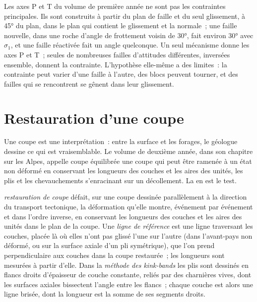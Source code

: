 Les axes P et T du volume de première année ne sont pas les contraintes principales. Ils
sont construits à partir du plan de faille et du seul glissement, à \ang{45} du plan, dans
le plan qui contient le glissement et la normale~; une faille nouvelle, dans une roche d'angle
de frottement voisin de \ang{30}, fait environ \ang{30} avec $\sigma_1$, et une faille réactivée
fait un angle quelconque. Un seul mécanisme donne les axes P et T~; seules de nombreuses
failles d'attitudes différentes, inversées ensemble, donnent la contrainte. L'hypothèse
elle-même a des limites~: la contrainte peut varier d'une faille à l'autre, des blocs peuvent
tourner, et des failles qui se rencontrent se gênent dans leur glissement.

\section{Restauration d'une coupe}\label{sec:b3:structural-analysis:restoration}

Une coupe est une interprétation~: entre la surface et les forages, le géologue
dessine ce qui est vraisemblable. Le volume de deuxième année, dans son chapitre sur les
Alpes, appelle coupe équilibrée une coupe qui peut être ramenée à un état non déformé
en conservant les longueurs des couches et les aires des unités, les plis et les
chevauchements s'enracinant sur un décollement. La  en est le test.

\begin{definition}\label{def:b3:structural-analysis:restoration}
\emph{restauration de coupe} défait, sur une coupe dessinée
parallèlement à la direction du transport tectonique, la déformation qu'elle montre,
événement par événement et dans l'ordre inverse, en conservant les longueurs des couches
et les aires des unités dans le plan de la coupe.
Une \emph{ligne de référence} est une ligne traversant les couches, placée là où elles
n'ont pas glissé l'une sur l'autre (dans l'avant-pays non déformé, ou sur la surface axiale
d'un pli symétrique), que l'on prend perpendiculaire aux couches
dans la coupe restaurée~; les longueurs sont mesurées à partir d'elle. Dans la
\emph{méthode des kink-bands} les plis sont dessinés en flancs droits
d'épaisseur de couche constante, reliés par des charnières vives, dont les surfaces axiales
bissectent l'angle entre les flancs~; chaque couche est alors une ligne brisée, dont
la longueur est la somme de ses segments droits.
\end{definition}

